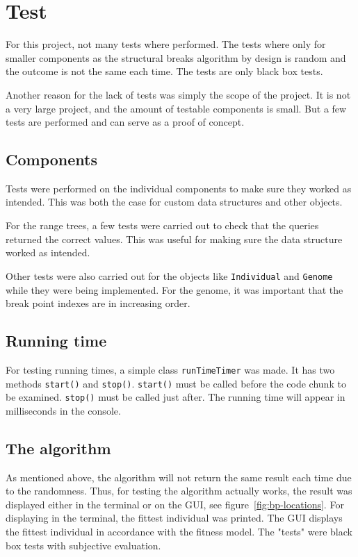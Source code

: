 
\section{Test} \label{sec:test}

For this project, not many tests where performed. The tests where only for
smaller components as the structural breaks algorithm by design is random and
the outcome is not the same each time. The tests are only black box tests. 

Another reason for the lack of tests was simply the scope of the project. It is
not a very large project, and the amount of testable components is small. But a
few tests are performed and can serve as a proof of concept. 

\subsection{Components}

Tests were performed on the individual components to make sure they worked as
intended. This was both the case for custom data structures and other objects. 

For the range trees, a few tests were carried out to check that the queries
returned the correct values. This was useful for making sure the data
structure worked as intended.  

Other tests were also carried out for the objects like \texttt{Individual} and
\texttt{Genome} while they were being implemented. For the genome, it was
important that the break point indexes are in increasing order. 

\subsection{Running time} \label{sec:test-running-time}

For testing running times, a simple class \texttt{runTimeTimer} was made. It has
two methods \texttt{start()} and \texttt{stop()}. \texttt{start()} must be called
before the code chunk to be examined. \texttt{stop()} must be called just after.
The running time will appear in milliseconds in the console. 

\subsection{The algorithm} \label{sec:test-the-algorithm}

As mentioned above, the algorithm will not return the same result each time due
to the randomness. Thus, for testing the algorithm actually works, the result
was displayed either in the terminal or on the GUI, see
figure~\ref{fig:bp-locations}. For displaying in the
terminal, the fittest individual was printed. The GUI displays the fittest
individual in accordance with the fitness model. The "tests" were black box
tests with subjective evaluation. 

